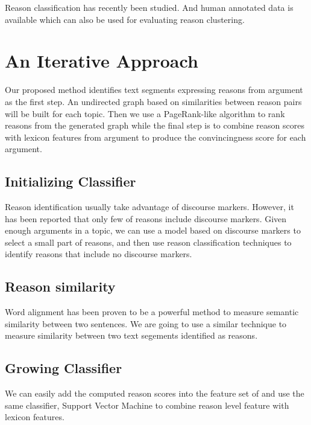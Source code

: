 \documentclass[11pt,a4paper]{article}
\begin{document}
Reason classification has recently been studied\cite{hasan2014you}. And human annotated data is available which can also be used for evaluating reason clustering.

\section{An Iterative Approach}

Our proposed method identifies text segments expressing reasons from argument as the first step. An undirected graph based on similarities between reason pairs will be built for each topic. Then we use a PageRank-like algorithm to rank reasons from the generated graph while the final step is to combine reason scores with lexicon features from argument to produce the convincingness score for each argument.  

\subsection{Initializing Classifier}

Reason identification usually take advantage of discourse markers\cite{palau2009argumentation}. However, it has been reported that only few of reasons include discourse markers\cite{marcu2002unsupervised}. Given enough arguments in a topic, we can use a model based on discourse markers to select a small part of reasons, and then use reason classification techniques to identify reasons that include no discourse markers.

\subsection{Reason similarity}

Word alignment has been proven to be a powerful method to measure semantic similarity between two sentences\cite{sultan2015dls}. We are going to use a similar technique to measure similarity between two text segements identified as reasons.

\subsection{Growing Classifier}

We can easily add the computed reason scores into the feature set of \cite{habernal2016argument} and use the same classifier, Support Vector Machine to combine reason level feature with lexicon features. 
\end{document}
